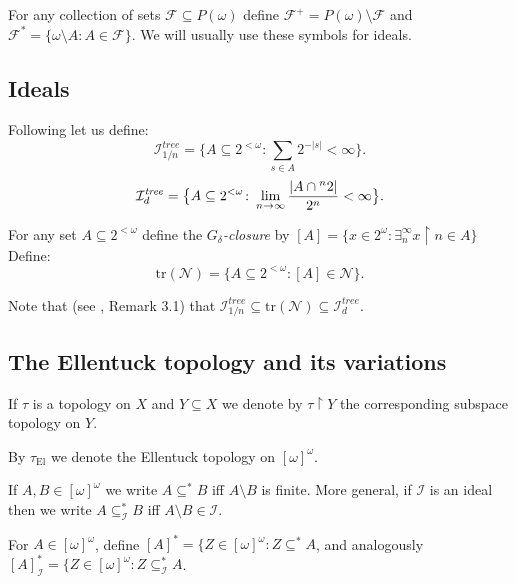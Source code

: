 \documentclass[12pt]{amsart}
\theoremstyle{plain}
\theoremstyle{definition}
\theoremstyle{remark}
\newcommand{\ca}{2^{\omega}}
\newcommand{\cantor}{\ca}
\newcommand{\ensembleDeFonctions}[2]{\prescript{#1}{}{#2}}
\newcommand{\infsub}{[\omega]^{\omega}}
\newcommand{\negligible}{\mathcal{N}}
\newcommand{\Negligible}{\negligible}
\newcommand{\calF}{\mathcal{F}}
\newcommand{\calI}{\mathcal{I}}
\newcommand{\cI}{\mathcal{I}}
\newcommand{\idealHarmonicznyTree}{\cI^{\mathit{tree}}_{1/n}}
\newcommand{\idealGestosciowyTree}{\cI^{\mathit{tree}}_{d}}
\newcommand{\idealTraceTree}{\mathrm{tr}(\Negligible)}
\newcommand{\EllentuckTopology}{\tau_\mathrm{El}}
\begin{document}
For any collection of sets $\calF \subseteq P(\omega)$
define
$\calF^+ = P(\omega) \setminus \calF$
and
$\calF^* = \lbrace \omega\setminus A\colon A \in \calF\rbrace$.
We will usually use these symbols for ideals.

\subsection{Ideals}

Following \cite{BorodulinNadziejaFarkasPlebanek2015}
let us define:
\[
  \idealHarmonicznyTree =
  \big\lbrace A \subseteq 2^{<\omega}\colon
  \sum_{s \in A} 2^{-|s|} < \infty \big\rbrace.
 \]
\[
  \idealGestosciowyTree =
  \big\lbrace A \subseteq 2^{<\omega}\colon
  \lim_{n \to \infty} \frac{|A \cap \ensembleDeFonctions{n}{2}|}{2^n} < \infty \big\rbrace.
 \]

 For any set $A \subseteq 2^{<\omega}$ define
 the {\it $G_{\delta}$-closure} by
 $[A] = \lbrace x \in \cantor \colon \exists_n^\infty x\restriction n \in A\rbrace$
 Define:
 \[
\idealTraceTree = \lbrace A \subseteq 2^{<\omega}\colon [A] \in \Negligible\rbrace.
 \]

 Note that (see \cite{BorodulinNadziejaFarkasPlebanek2015}, Remark 3.1) that
 $\idealHarmonicznyTree \subseteq \idealTraceTree \subseteq \idealGestosciowyTree$.
\subsection{The Ellentuck topology and its variations}

If $\tau$ is a topology on $X$ and $Y \subseteq X$ 
we denote by $\tau \restriction Y$ the corresponding subspace topology on $Y$.

By $\EllentuckTopology$ we denote the Ellentuck topology on $\infsub$.

If $A,B \in \infsub$ we write $A \subseteq^* B$ iff $A \setminus B$ is finite.
More general, if $\calI$ is an ideal then we write
$A \subseteq^*_{\calI} B$ iff $A \setminus B \in \calI$.

For $A \in \infsub$, define
$[A]^* = \lbrace Z \in \infsub\colon Z \subseteq^* A$,
and analogously
$[A]^*_{\calI} = \lbrace Z \in \infsub\colon Z \subseteq^*_{\calI} A$.
\end{document}
